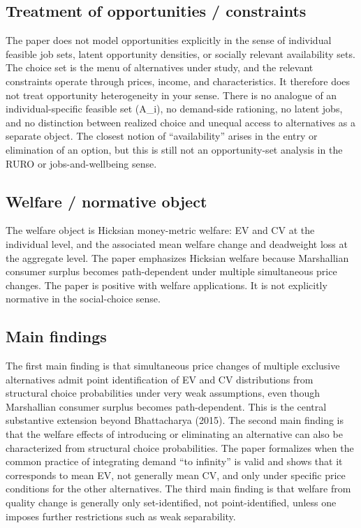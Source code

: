 \documentclass[11pt,a4paper]{article}
\begin{document}
\subsection*{Treatment of opportunities / constraints}
The paper does not model opportunities explicitly in the sense of individual feasible job sets, latent opportunity densities, or socially relevant availability sets. The choice set is the menu of alternatives under study, and the relevant constraints operate through prices, income, and characteristics. It therefore does not treat opportunity heterogeneity in your sense. There is no analogue of an individual-specific feasible set (A\_i), no demand-side rationing, no latent jobs, and no distinction between realized choice and unequal access to alternatives as a separate object. The closest notion of “availability” arises in the entry or elimination of an option, but this is still not an opportunity-set analysis in the RURO or jobs-and-wellbeing sense.

\subsection*{Welfare / normative object}
The welfare object is Hicksian money-metric welfare: EV and CV at the individual level, and the associated mean welfare change and deadweight loss at the aggregate level. The paper emphasizes Hicksian welfare because Marshallian consumer surplus becomes path-dependent under multiple simultaneous price changes. The paper is positive with welfare applications. It is not explicitly normative in the social-choice sense.

\subsection*{Main findings}
The first main finding is that simultaneous price changes of multiple exclusive alternatives admit point identification of EV and CV distributions from structural choice probabilities under very weak assumptions, even though Marshallian consumer surplus becomes path-dependent. This is the central substantive extension beyond Bhattacharya (2015). The second main finding is that the welfare effects of introducing or eliminating an alternative can also be characterized from structural choice probabilities. The paper formalizes when the common practice of integrating demand “to infinity” is valid and shows that it corresponds to mean EV, not generally mean CV, and only under specific price conditions for the other alternatives. The third main finding is that welfare from quality change is generally only set-identified, not point-identified, unless one imposes further restrictions such as weak separability.
\end{document}
